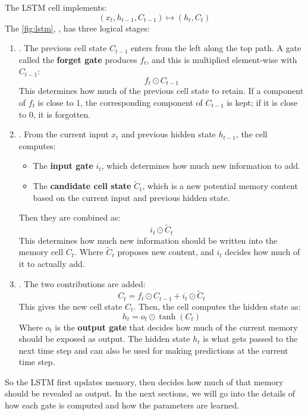 \noindent
The LSTM cell implements:
\begin{equation*}
    \left( x_t, h_{t-1}, C_{t-1} \right) \longmapsto \left( h_t, C_t \right)
\end{equation*}
The \autoref{fig:lstm}, , has three logical stages:
\begin{enumerate}
    \item {}. The previous cell state $C_{t-1}$ enters from the left along the top path. A gate called the \textbf{forget gate} produces $f_t$, and this is multiplied element-wise with $C_{t-1}$:
    \begin{equation*}
        f_t \odot C_{t-1}
    \end{equation*}
    This determines how much of the previous cell state to retain. If a component of $f_t$ is close to 1, the corresponding component of $C_{t-1}$ is kept; if it is close to 0, it is forgotten.


    \item {}. From the current input $x_t$ and previous hidden state $h_{t-1}$, the cell computes:
    \begin{itemize}
        \item The \textbf{input gate} $i_t$, which determines how much new information to add.
        \item The \textbf{candidate cell state} $\tilde{C}_t$, which is a new potential memory content based on the current input and previous hidden state.
    \end{itemize}
    Then they are combined as:
    \begin{equation*}
        i_t \odot \tilde{C}_t
    \end{equation*}
    This determines how much new information should be written into the memory cell $C_t$. Where $\tilde{C}_t$ proposes new content, and $i_t$ decides how much of it to actually add.


    \item {}. The two contributions are added:
    \begin{equation*}
        C_t = f_t \odot C_{t-1} + i_t \odot \tilde{C}_t
    \end{equation*}
    This gives the new cell state $C_t$. Then, the cell computes the hidden state as:
    \begin{equation*}
        h_t = o_t \odot \tanh(C_t)
    \end{equation*}
    Where $o_t$ is the \textbf{output gate} that decides how much of the current memory should be exposed as output. The hidden state $h_t$ is what gets passed to the next time step and can also be used for making predictions at the current time step.
\end{enumerate}
So the LSTM first updates memory, then decides how much of that memory should be revealed as output. In the next sections, we will go into the details of how each gate is computed and how the parameters are learned.